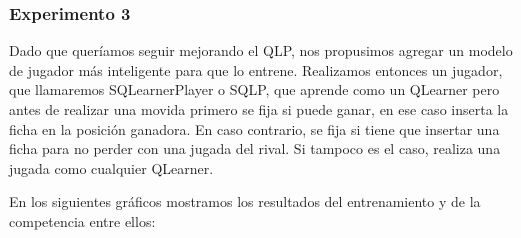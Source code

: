 \documentclass[10pt, a4paper]{article}
\begin{document}







\subsubsection{Experimento 3}

Dado que queríamos seguir mejorando el QLP, nos propusimos agregar un modelo de jugador más inteligente para que lo entrene. Realizamos entonces un jugador, que llamaremos SQLearnerPlayer o SQLP, que aprende como un QLearner pero antes de realizar una movida primero se fija si puede ganar, en ese caso inserta la ficha en la posición ganadora. En caso contrario, se fija si tiene que insertar una ficha para no perder con una jugada del rival. Si tampoco es el caso, realiza una jugada como cualquier QLearner.

En los siguientes gráficos mostramos los resultados del entrenamiento y de la competencia entre ellos:
\end{document}
